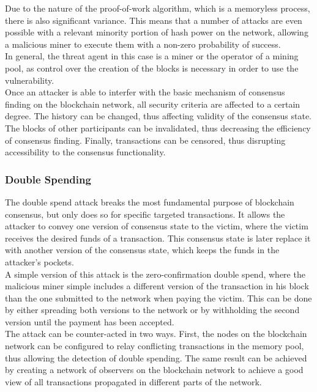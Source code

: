 \documentclass[11pt,a4paper,draft]{article}
\begin{document}
Due to the nature of the proof-of-work algorithm, which is a memoryless process, there is also significant variance. This means that a number of attacks are even possible with a relevant minority portion of hash power on the network, allowing a malicious miner to execute them with a non-zero probability of success.\\

In general, the threat agent in this case is a miner or the operator of a mining pool, as control over the creation of the blocks is necessary in order to use the vulnerability.\\

Once an attacker is able to interfer with the basic mechanism of consensus finding on the blockchain network, all security criteria are affected to a certain degree. The history can be changed, thus affecting validity of the consensus state. The blocks of other participants can be invalidated, thus decreasing the efficiency of consensus finding. Finally, transactions can be censored, thus disrupting accessibility to the consensus functionality.\\

\subsubsection{Double Spending}

The double spend attack breaks the most fundamental purpose of blockchain consensus, but only does so for specific targeted transactions. It allows the attacker to convey one version of consensus state to the victim, where the victim receives the desired funds of a transaction. This consensus state is later replace it with another version of the consensus state, which keeps the funds in the attacker's pockets.\\

A simple version of this attack is the zero-confirmation double spend, where the malicious miner simple includes a different version of the transaction in his block than the one submitted to the network when paying the victim. This can be done by either spreading both versions to the network or by withholding the second version until the payment has been accepted.\\

The attack can be counter-acted in two ways. First, the nodes on the blockchain network can be configured to relay conflicting transactions in the memory pool, thus allowing the detection of double spending. The same result can be achieved by creating a network of observers on the blockchain network to achieve a good view of all transactions propagated in different parts of the network.\\
\end{document}
